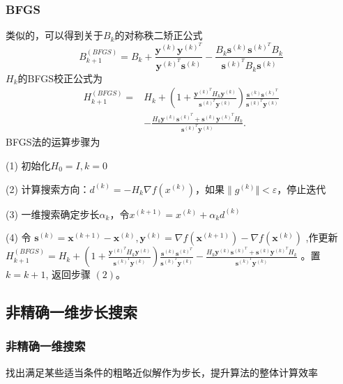 \documentclass[12pt, a4paper, oneside]{ctexart}
\begin{document}
\subsubsection*{BFGS}
类似的，可以得到关于$B_{k}$的对称秩二矫正公式
$$
B_{k+1}^{(B F G S)}=B_k+\frac{\mathbf{y}^{(k)} \mathbf{y}^{(k)^T}}{\mathbf{y}^{(k)^T} \mathbf{s}^{(k)}}-\frac{B_k \mathbf{s}^{(k)} \mathbf{s}^{(k)^T} B_k}{\mathbf{s}^{(k)^T} B_k \mathbf{s}^{(k)}}
$$
$H_{k}$的BFGS校正公式为
$$
\begin{aligned}
H_{k+1}^{(B F G S)}= & H_k+\left(1+\frac{\mathbf{y}^{(k)^T} H_k \mathbf{y}^{(k)}}{\mathbf{s}^{(k)^T} \mathbf{y}^{(k)}}\right) \frac{\mathbf{s}^{(k)} \mathbf{s}^{(k)^T}}{\mathbf{s}^{(k)^T} \mathbf{y}^{(k)}} \\
& -\frac{H_k \mathbf{y}^{(k)} \mathbf{s}^{(k)^T}+\mathbf{s}^{(k)} \mathbf{y}^{(k)^T} H_k}{\mathbf{s}^{(k)^T} \mathbf{y}^{(k)}} .
\end{aligned}
$$
BFGS法的运算步骤为
\begin{algorithm*}
    \caption{}
    \label{alg:algorithm}
    \BlankLine
    (1) 初始化$H_{0} = I, k = 0$

    (2) 计算搜索方向：$d^{(k)} = -H_{k} \nabla f(x^{(k)})$，如果$\| g^{(k)}\Vert < \varepsilon$，停止迭代

    (3) 一维搜索确定步长$\alpha_{k}$，令$x^{(k+1)} = x^{(k)} + \alpha_{k}d^{(k)}$

    (4) 令 $\mathbf{s}^{(k)}=\mathbf{x}^{(k+1)}-\mathbf{x}^{(k)}, \mathbf{y}^{(k)}=\nabla f\left(\mathbf{x}^{(k+1)}\right)-\nabla f\left(\mathbf{x}^{(k)}\right)$ ,作更新 $H_{k+1}^{(B F G S)}=H_k+\left(1+\frac{\mathbf{y}^{(k)^T} H_k \mathbf{y}^{(k)}}{\mathbf{s}^{(k)^T} \mathbf{y}^{(k)}}\right) \frac{\mathbf{s}^{(k)} \mathbf{s}^{(k)^T}}{\mathbf{s}^{(k)^T} \mathbf{y}^{(k)}}-\frac{H_k \mathbf{y}^{(k)} \mathbf{s}^{(k)^T}+\mathbf{s}^{(k)} \mathbf{y}^{(k)^T} H_k}{\mathbf{s}^{(k)^T} \mathbf{y}^{(k)}}$ 。置 $k=k+1$, 返回步骤 $(2) 。$
\end{algorithm*}
\newpage
\subsection*{非精确一维步长搜索}
\subsubsection*{非精确一维搜索}

找出满足某些适当条件的粗略近似解作为步长，提升算法的整体计算效率
\end{document}
